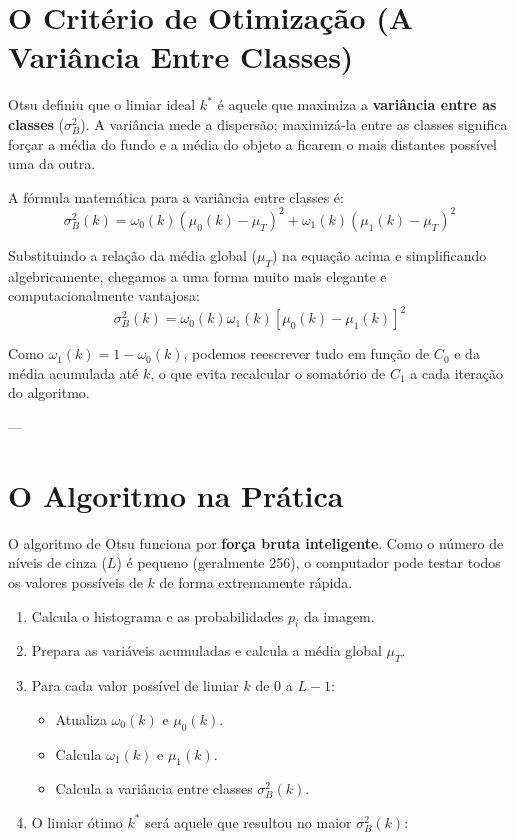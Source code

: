 \documentclass[12pt, a4paper]{article}
\begin{document}
\section{O Critério de Otimização (A Variância Entre Classes)}

Otsu definiu que o limiar ideal $k^*$ é aquele que maximiza a \textbf{variância entre as classes} ($\sigma_B^2$). A variância mede a dispersão; maximizá-la entre as classes significa forçar a média do fundo e a média do objeto a ficarem o mais distantes possível uma da outra.

A fórmula matemática para a variância entre classes é:
\begin{equation}
    \sigma_B^2(k) = \omega_0(k)(\mu_0(k) - \mu_T)^2 + \omega_1(k)(\mu_1(k) - \mu_T)^2
\end{equation}

Substituindo a relação da média global ($\mu_T$) na equação acima e simplificando algebricamente, chegamos a uma forma muito mais elegante e computacionalmente vantajosa:
\begin{equation}
    \sigma_B^2(k) = \omega_0(k)\omega_1(k) \left[ \mu_0(k) - \mu_1(k) \right]^2
\end{equation}

Como $\omega_1(k) = 1 - \omega_0(k)$, podemos reescrever tudo em função de $C_0$ e da média acumulada até $k$, o que evita recalcular o somatório de $C_1$ a cada iteração do algoritmo.

---

\section{O Algoritmo na Prática}

O algoritmo de Otsu funciona por \textbf{força bruta inteligente}. Como o número de níveis de cinza ($L$) é pequeno (geralmente 256), o computador pode testar todos os valores possíveis de $k$ de forma extremamente rápida.

\begin{enumerate}
    \item Calcula o histograma e as probabilidades $p_i$ da imagem.
    \item Prepara as variáveis acumuladas e calcula a média global $\mu_T$.
    \item Para cada valor possível de limiar $k$ de $0$ a $L-1$:
    \begin{itemize}
        \item Atualiza $\omega_0(k)$ e $\mu_0(k)$.
        \item Calcula $\omega_1(k)$ e $\mu_1(k)$.
        \item Calcula a variância entre classes $\sigma_B^2(k)$.
    \end{itemize}
    \item O limiar ótimo $k^*$ será aquele que resultou no maior $\sigma_B^2(k)$:
\end{enumerate}
\end{document}
